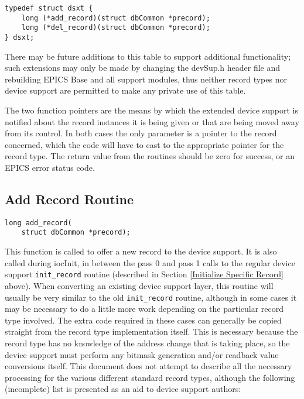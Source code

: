 \begin{verbatim}
typedef struct dsxt {
    long (*add_record)(struct dbCommon *precord);
    long (*del_record)(struct dbCommon *precord);
} dsxt;
\end{verbatim}

There may be future additions to this table to support additional functionality; such extensions may only be made by 
changing the devSup.h header file and rebuilding EPICS Base and all support modules, thus neither record types nor 
device support are permitted to make any private use of this table.

The two function pointers are the means by which the extended device support is notified about the record instances it is 
being given or that are being moved away from its control. In both cases the only parameter is a pointer to the record 
concerned, which the code will have to cast to the appropriate pointer for the record type. The return value from the 
routines should be zero for success, or an EPICS error status code.

\subsection{Add Record Routine}

\begin{verbatim}
long add_record(
    struct dbCommon *precord);
\end{verbatim}

This function is called to offer a new record to the device support. It is also called during iocInit, in between the pass 0 and 
pass 1 calls to the regular device support \verb|init_record| routine (described in Section \ref{Initialize Specific Record} above). When 
converting an existing device support layer, this routine will usually be very similar to the old \verb|init_record| routine, 
although in some cases it may be necessary to do a little more work depending on the particular record type involved. The 
extra code required in these cases can generally be copied straight from the record type implementation itself. This is 
necessary because the record type has no knowledge of the address change that is taking place, so the device support must 
perform any bitmask generation and/or readback value conversions itself. This document does not attempt to describe all 
the necessary processing for the various different standard record types, although the following (incomplete) list is 
presented as an aid to device support authors:

